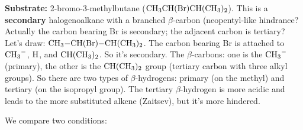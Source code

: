 \documentclass[11pt]{article}
\begin{document}
\begin{corrige}
\textbf{Substrate:} 2-bromo-3-methylbutane (\(\ce{CH3CH(Br)CH(CH3)2}\)). This is a \textbf{secondary} halogenoalkane with a branched \(\beta\)-carbon (neopentyl-like hindrance? Actually the carbon bearing Br is secondary; the adjacent carbon is tertiary? Let's draw: \(\ce{CH3-CH(Br)-CH(CH3)2}\). The carbon bearing Br is attached to \(\ce{CH3-}\), \(\ce{H}\), and \(\ce{CH(CH3)2}\). So it's secondary. The \(\beta\)-carbons: one is the \(\ce{CH3-}\) (primary), the other is the \(\ce{CH(CH3)2}\) group (tertiary carbon with three alkyl groups). So there are two types of \(\beta\)-hydrogens: primary (on the methyl) and tertiary (on the isopropyl group). The tertiary \(\beta\)-hydrogen is more acidic and leads to the more substituted alkene (Zaitsev), but it's more hindered.

We compare two conditions:


\end{corrige}
\end{document}
